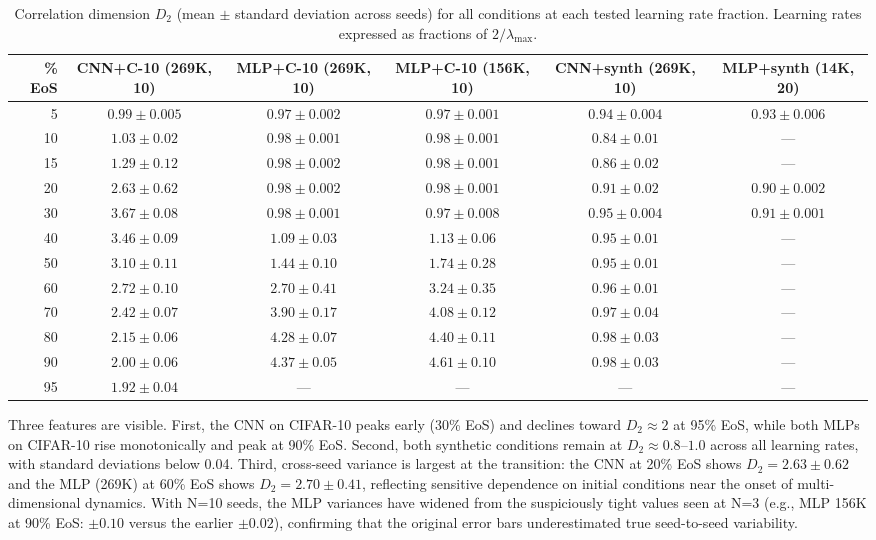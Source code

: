 \documentclass[aps,prl,twocolumn,superscriptaddress]{revtex4-2}
\begin{document}
\begin{table}[t]
\caption{\label{tab:d2_all}%
Correlation dimension $D_2$ (mean $\pm$ standard deviation across seeds) for all conditions at each tested learning rate fraction. Learning rates expressed as fractions of $2/\lambda_{\max}$.}
\begin{ruledtabular}
\begin{tabular}{r|ccccc}
\% EoS & CNN+C-10 (269K, 10) & MLP+C-10 (269K, 10) & MLP+C-10 (156K, 10) & CNN+synth (269K, 10) & MLP+synth (14K, 20)\\
\hline
5 & $0.99 \pm 0.005$ & $0.97 \pm 0.002$ & $0.97 \pm 0.001$ & $0.94 \pm 0.004$ & $0.93 \pm 0.006$\\
10 & $1.03 \pm 0.02$ & $0.98 \pm 0.001$ & $0.98 \pm 0.001$ & $0.84 \pm 0.01$ & ---\\
15 & $1.29 \pm 0.12$ & $0.98 \pm 0.002$ & $0.98 \pm 0.001$ & $0.86 \pm 0.02$ & ---\\
20 & $2.63 \pm 0.62$ & $0.98 \pm 0.002$ & $0.98 \pm 0.001$ & $0.91 \pm 0.02$ & $0.90 \pm 0.002$\\
30 & $\mathbf{3.67 \pm 0.08}$ & $0.98 \pm 0.001$ & $0.97 \pm 0.008$ & $0.95 \pm 0.004$ & $0.91 \pm 0.001$\\
40 & $3.46 \pm 0.09$ & $1.09 \pm 0.03$ & $1.13 \pm 0.06$ & $0.95 \pm 0.01$ & ---\\
50 & $3.10 \pm 0.11$ & $1.44 \pm 0.10$ & $1.74 \pm 0.28$ & $0.95 \pm 0.01$ & ---\\
60 & $2.72 \pm 0.10$ & $2.70 \pm 0.41$ & $3.24 \pm 0.35$ & $0.96 \pm 0.01$ & ---\\
70 & $2.42 \pm 0.07$ & $3.90 \pm 0.17$ & $4.08 \pm 0.12$ & $0.97 \pm 0.04$ & ---\\
80 & $2.15 \pm 0.06$ & $4.28 \pm 0.07$ & $4.40 \pm 0.11$ & $0.98 \pm 0.03$ & ---\\
90 & $2.00 \pm 0.06$ & $\mathbf{4.37 \pm 0.05}$ & $\mathbf{4.61 \pm 0.10}$ & $0.98 \pm 0.03$ & ---\\
95 & $1.92 \pm 0.04$ & --- & --- & --- & ---\\
\end{tabular}
\end{ruledtabular}
\end{table}

Three features are visible. First, the CNN on CIFAR-10 peaks early (30\% EoS) and declines toward $D_2 \approx 2$ at 95\% EoS, while both MLPs on CIFAR-10 rise monotonically and peak at 90\% EoS. Second, both synthetic conditions remain at $D_2 \approx 0.8$--$1.0$ across all learning rates, with standard deviations below 0.04. Third, cross-seed variance is largest at the transition: the CNN at 20\% EoS shows $D_2 = 2.63 \pm 0.62$ and the MLP (269K) at 60\% EoS shows $D_2 = 2.70 \pm 0.41$, reflecting sensitive dependence on initial conditions near the onset of multi-dimensional dynamics. With N=10 seeds, the MLP variances have widened from the suspiciously tight values seen at N=3 (e.g., MLP 156K at 90\% EoS: $\pm 0.10$ versus the earlier $\pm 0.02$), confirming that the original error bars underestimated true seed-to-seed variability.
\end{document}
